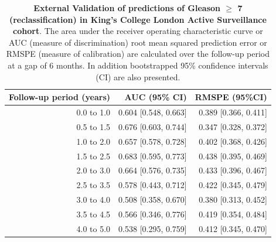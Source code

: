 \begin{table}[!htb]
\small\sf\centering
\caption{\textbf{External Validation of predictions of Gleason $\geq$ 7 (reclassification) in King's College London Active Surveillance cohort}. The area under the receiver operating characteristic curve or AUC (measure of discrimination) root mean squared prediction error or RMSPE (measure of calibration) are calculated over the follow-up period at a gap of 6 months. In addition bootstrapped 95\% confidence intervals (CI) are also presented.}
\label{tab:AUC_PE_KCL}
\begin{tabular}{r|r|r}
\hline
\hline
Follow-up period (years) & AUC (95\% CI) & RMSPE (95\%CI)\\ 
\hline
0.0 to 1.0 & 0.604 [0.548, 0.663] & 0.389 [0.366, 0.411]\\
0.5 to 1.5 & 0.676 [0.603, 0.744] & 0.347 [0.328, 0.372]\\
1.0 to 2.0 & 0.657 [0.578, 0.728] & 0.402 [0.368, 0.426]\\
1.5 to 2.5 & 0.683 [0.595, 0.773] & 0.438 [0.395, 0.469]\\
2.0 to 3.0 & 0.664 [0.576, 0.735] & 0.433 [0.396, 0.467]\\
2.5 to 3.5 & 0.578 [0.443, 0.712] & 0.422 [0.345, 0.479]\\
3.0 to 4.0 & 0.508 [0.358, 0.670] & 0.380 [0.313, 0.452]\\
3.5 to 4.5 & 0.566 [0.346, 0.776] & 0.419 [0.354, 0.484]\\
4.0 to 5.0 & 0.538 [0.295, 0.759] & 0.412 [0.345, 0.470]\\
\hline
\end{tabular}	
\end{table}

